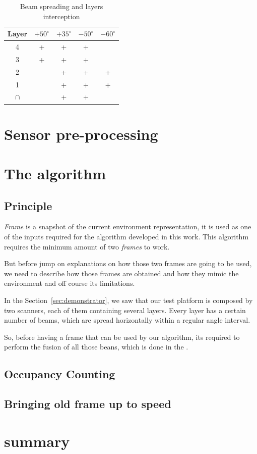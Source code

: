 \begin{table}
	\begin{center}
	    \begin{tabular}{ | c | c | c | c | c |}
		    \hline
		    Layer & $+50^\circ$ & $+35^\circ$ & $-50^\circ$ & $-60^\circ$ \\ \hline
		    4 & + & + & + &  \\ \hline
		    3 & + & + & + &  \\ \hline
		    2 &  & + & + & + \\ \hline
		    1 &  & + & + & + \\ \hline
		    $\cap$ &  & + & + &  \\ \hline
	    \end{tabular}
	\end{center}    
    \label{tab:beam:interception}
    \caption{Beam spreading and layers interception}
\end{table}



\section{Sensor pre-processing} %


\section{The algorithm}

\subsection{Principle} 

\textit{Frame} is a snapshot of the current environment representation, it is used as one of the inputs required for the algorithm developed in this work. This algorithm requires the minimum amount of two \textit{frames} to work. 

But before jump on explanations on how those two frames are going to be used, we need to describe how those frames are obtained and how they mimic the environment and off course its limitations.

In the Section~\ref{sec:demonstrator}, we saw that our test platform is composed by two scanners, each of them containing several layers. Every layer has a certain number of beams, which are spread horizontally within a regular angle interval. 

So, before having a frame that can be used by our algorithm, its required to perform the fusion of all those beans, which is done in the \textit{}. 

\subsection{Occupancy Counting} 

\subsection{Bringing old frame up to speed}


\section{summary}

